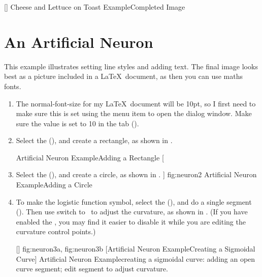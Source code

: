 []
{}
{Cheese and Lettuce on Toast Example\dash Completed Image}

\section{An Artificial Neuron}\label{sec:neuronexample}

This example illustrates setting line styles and adding text.
The final image looks best as a  picture included
in a \LaTeX\ document, as then you can use maths fonts.

\begin{enumerate}
\item The \gls{normal-font-size} for my \LaTeX\ document will be
10\gls{pt}, so I first need to make sure this is set using the
 menu item to open the
 dialog window. Make sure the
 value is set to 10 in the
 tab ().

\item Select the  (),
and create a rectangle, as shown in .

{}
{Artificial Neuron Example\dash Adding a Rectangle}
[
  \item Select the  (),
  and create a circle, as shown in .
]
{fig:neuron2}
{}
{Artificial Neuron Example\dash Adding a Circle}

\item To make the logistic function symbol, select the
 (), and do a single
segment ().  Then use switch to
\editpathmode\ to adjust the curvature, as shown in
.  (If you have enabled the \gridlock, you
may find it easier to disable it while you are editing the curvature
control points.)

[]
{
  {fig:neuron3a}{}{},
  {fig:neuron3b}{}{}
}
[Artificial Neuron Example\dash Creating a Sigmoidal Curve]
{Artificial Neuron Example\dash creating a sigmoidal
curve:
 adding an open curve segment;
 edit segment to adjust curvature.}


\end{enumerate}
